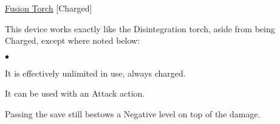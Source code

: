\medskip\noindent\underline{Fusion Torch} [Charged]

\noindent This device works exactly like the Disintegration torch, aside from being Charged, except where noted below:

\begin{list}{$\bullet$}{\itemspace}
\item It is effectively unlimited in use, always charged.
\item It can be used with an Attack action.
\item Passing the save still bestows a Negative level on top of the damage.
\end{list}